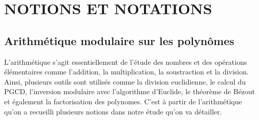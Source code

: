 \documentclass[a4paper]{article}
\begin{document}
\section{NOTIONS ET NOTATIONS}

\subsection{Arithmétique modulaire sur les polynômes}

L'arithmétique s'agit essentiellement de l'étude des nombres et des opérations élémentaires comme l'addition, la multiplication, la soustraction et la division. Ainsi, plusieurs outils sont utilisés comme la division euclidienne, le calcul du PGCD, l'inversion modulaire avec l'algorithme d'Euclide, le théorème de Bézout et également la factorisation des polynomes. C'est à partir de l'arithmétique qu'on a recueilli plusieurs notions dans notre étude qu'on va détailler.
\end{document}
